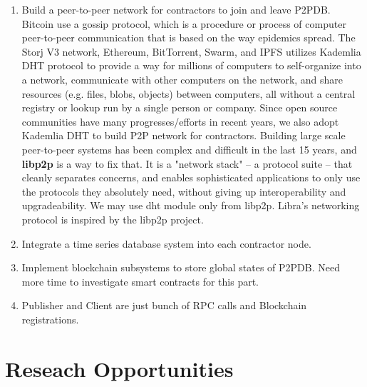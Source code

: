 \documentclass[12pt]{article}
\begin{document}
\begin{enumerate}
\item Build a peer-to-peer network for contractors to join and leave P2PDB. Bitcoin use a gossip protocol, which is a procedure or process of computer peer-to-peer communication that is based on the way epidemics spread.  The Storj V3 network, Ethereum, BitTorrent, Swarm, and IPFS utilizes Kademlia DHT protocol \cite{Maymounkov:2002:KPI:646334.687801} to provide a way for millions of computers to self-organize into a network, communicate with other computers on the network, and share resources (e.g. files, blobs, objects) between computers, all without a central registry or lookup run by a single person or company. Since open source communities have many progresses/efforts in recent years, we also adopt Kademlia DHT to build P2P network for contractors. Building large scale peer-to-peer systems has been complex and difficult in the last 15 years, and \textbf{libp2p} \cite{libp2p} is a way to fix that. It is a "network stack" -- a protocol suite -- that cleanly separates concerns, and enables sophisticated applications to only use the protocols they absolutely need, without giving up interoperability and upgradeability. We may use dht module \cite{libp2p-dht} only from libp2p.
Libra's networking protocol \cite{libra-doc} is inspired by the libp2p project. 

\item Integrate a time series database system into each contractor node.

\item Implement blockchain subsystems to store global states of P2PDB. Need more time to investigate smart contracts for this part. 

\item Publisher and Client are just bunch of RPC calls and Blockchain registrations.

\end{enumerate}

\section{Reseach Opportunities}
\end{document}
